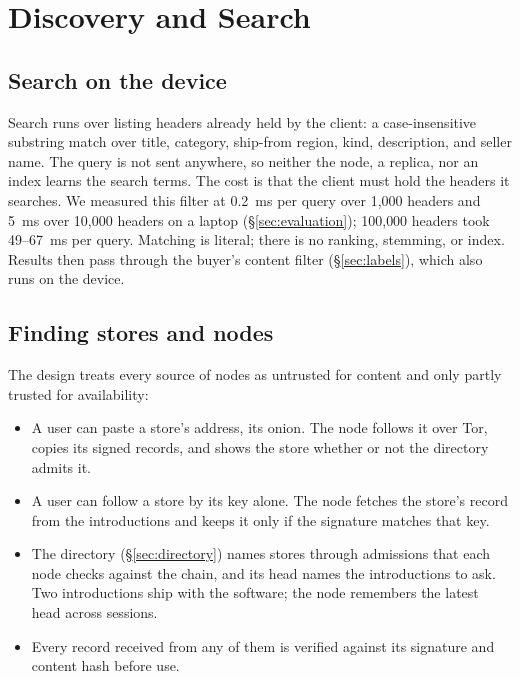 \section{Discovery and Search}
\label{sec:discovery}

\subsection{Search on the device}

Search runs over listing headers already held by the client: a case-insensitive substring match over title, category, ship-from region, kind, description, and seller name. The query is not sent anywhere, so neither the node, a replica, nor an index learns the search terms. The cost is that the client must hold the headers it searches. We measured this filter at 0.2~ms per query over 1{,}000 headers and 5~ms over 10{,}000 headers on a laptop (\S\ref{sec:evaluation}); 100{,}000 headers took 49--67~ms per query. Matching is literal; there is no ranking, stemming, or index. Results then pass through the buyer's content filter (\S\ref{sec:labels}), which also runs on the device.

\subsection{Finding stores and nodes}

The design treats every source of nodes as untrusted for content and only partly trusted for availability:
\begin{itemize}
  \item A user can paste a store's address, its onion. The node follows it over Tor, copies its signed records, and shows the store whether or not the directory admits it.
  \item A user can follow a store by its key alone. The node fetches the store's record from the introductions and keeps it only if the signature matches that key.
  \item The directory (\S\ref{sec:directory}) names stores through admissions that each node checks against the chain, and its head names the introductions to ask. Two introductions ship with the software; the node remembers the latest head across sessions.
  \item Every record received from any of them is verified against its signature and content hash before use.
\end{itemize}

